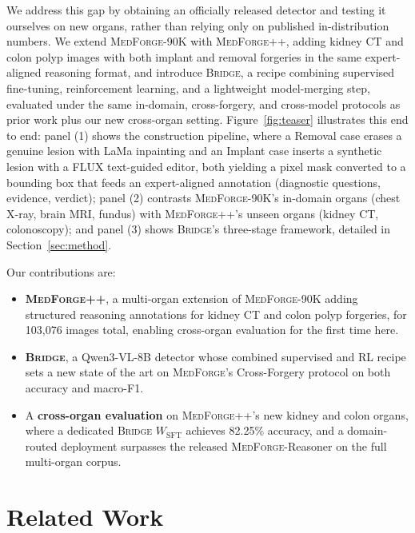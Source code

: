 \documentclass[10pt,twocolumn,letterpaper]{article}
\newcommand{\bridge}{\textsc{Bridge}}
\newcommand{\medforge}{\textsc{MedForge}}
\newcommand{\medforgepp}{\textsc{MedForge++}}
\begin{document}
We address this gap by obtaining an officially released detector and testing it ourselves on new organs, rather than relying only on published in-distribution numbers. We extend \medforge{}-90K with \medforgepp{}, adding kidney CT and colon polyp images with both implant and removal forgeries in the same expert-aligned reasoning format, and introduce \bridge{}, a recipe combining supervised fine-tuning, reinforcement learning, and a lightweight model-merging step, evaluated under the same in-domain, cross-forgery, and cross-model protocols as prior work plus our new cross-organ setting. Figure~\ref{fig:teaser} illustrates this end to end: panel (1) shows the construction pipeline, where a Removal case erases a genuine lesion with LaMa inpainting and an Implant case inserts a synthetic lesion with a FLUX text-guided editor, both yielding a pixel mask converted to a bounding box that feeds an expert-aligned annotation (diagnostic questions, evidence, verdict); panel (2) contrasts \medforge{}-90K's in-domain organs (chest X-ray, brain MRI, fundus) with \medforgepp{}'s unseen organs (kidney CT, colonoscopy); and panel (3) shows \bridge{}'s three-stage framework, detailed in Section~\ref{sec:method}.

Our contributions are:
\begin{itemize}
\setlength{\itemsep}{1pt}
\setlength{\parskip}{0pt}
    \item \textbf{\medforgepp{}}, a multi-organ extension of \medforge{}-90K adding structured reasoning annotations for kidney CT and colon polyp forgeries, for 103{,}076 images total, enabling cross-organ evaluation for the first time here.
    \item \textbf{\bridge{}}, a Qwen3-VL-8B detector whose combined supervised and RL recipe sets a new state of the art on \medforge{}'s Cross-Forgery protocol on both accuracy and macro-F1.
    \item A \textbf{cross-organ evaluation} on \medforgepp{}'s new kidney and colon organs, where a dedicated \bridge{} $W_{\mathrm{SFT}}$ achieves 82.25\% accuracy, and a domain-routed deployment surpasses the released \medforge{}-Reasoner on the full multi-organ corpus.
\end{itemize}

\section{Related Work}
\label{sec:related}
\end{document}
